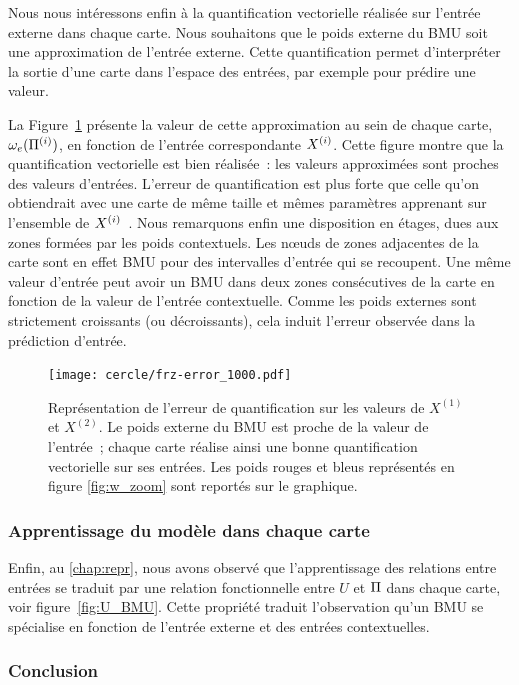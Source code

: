 \documentclass[../main]{subfiles}
\begin{document}
Nous nous intéressons enfin à la quantification vectorielle réalisée sur l'entrée externe dans chaque carte. 
Nous souhaitons que le poids externe du BMU soit une approximation de l'entrée externe. Cette quantification permet d'interpréter la sortie d'une carte dans l'espace des entrées, par exemple pour prédire une valeur.

La Figure~\ref{fig:qv} présente la valeur de cette approximation au sein de chaque carte, $\omega_{e}(\Pi^{({i})})$, en fonction de l'entrée correspondante $X^{({i})}$. 
Cette figure montre que la quantification vectorielle est bien réalisée~: les valeurs approximées sont proches des valeurs d'entrées.
L'erreur de quantification est plus forte que celle qu'on obtiendrait avec une carte de même taille et mêmes paramètres apprenant sur l'ensemble de $X^{({i})}$~. 
Nous remarquons enfin une disposition en étages, dues aux zones formées par les poids contextuels.
Les n\oe{}uds de zones adjacentes de la carte sont en effet BMU pour des intervalles d'entrée qui se recoupent.
Une même valeur d'entrée peut avoir un BMU dans deux zones consécutives de la carte en fonction de la valeur de l'entrée contextuelle. Comme les poids externes sont strictement croissants (ou décroissants), cela induit l'erreur observée dans la prédiction d'entrée.

\begin{figure}[h!]
	\centering\texttt{[image: cercle/frz-error\_1000.pdf]}
	\caption{Représentation de l'erreur de quantification sur les valeurs de $X^{(1)}$ et $X^{(2)}$. Le poids externe du BMU est proche de la valeur de l'entrée~; chaque carte réalise ainsi une bonne quantification vectorielle sur ses entrées. 
	Les poids rouges et bleus représentés en figure \ref{fig:w_zoom} sont reportés sur le graphique. \label{fig:qv}}
\end{figure}

\subsubsection{Apprentissage du modèle dans chaque carte}

Enfin, au \ref{chap:repr}, nous avons observé que l'apprentissage des relations entre entrées se traduit par une relation fonctionnelle entre $U$ et $\Pi$ dans chaque carte, voir figure~\ref{fig:U_BMU}.
Cette propriété traduit l'observation qu'un BMU se spécialise en fonction de l'entrée externe et des entrées contextuelles.

\subsubsection{Conclusion}
\end{document}

